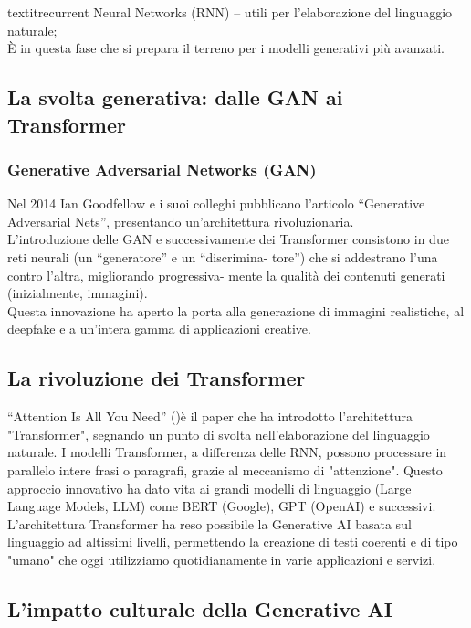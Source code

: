 \documentclass[14pt]{extbook}
\begin{document}
textit{recurrent Neural Networks (RNN) –} utili per l’elaborazione del linguaggio naturale;\\

È in questa fase che si prepara il terreno per i modelli generativi più avanzati.\\
\subsection{La svolta generativa: dalle GAN ai Transformer}
\subsubsection{Generative Adversarial Networks (GAN)}
Nel 2014 Ian Goodfellow e i suoi colleghi pubblicano l’articolo “Generative Adversarial Nets”, presentando un’architettura rivoluzionaria.\\

L’introduzione delle GAN \cite{goodfellow2014gan} e successivamente dei Transformer \cite{vaswani2017attention}consistono in due reti neurali (un “generatore” e un “discrimina- tore”) che si addestrano l’una contro l’altra, migliorando progressiva- mente la qualità dei contenuti generati (inizialmente, immagini).\\

Questa innovazione ha aperto la porta alla generazione di immagini realistiche, al deepfake e a un’intera gamma di applicazioni creative.\\

\subsection{La rivoluzione dei Transformer}
“Attention Is All You Need” (\cite{vaswani2017})è il paper che ha introdotto l'architettura "Transformer", segnando un punto di svolta nell'elaborazione del linguaggio naturale. I modelli Transformer, a differenza delle RNN, possono processare in parallelo intere frasi o paragrafi, grazie al meccanismo di "attenzione". Questo approccio innovativo ha dato vita ai grandi modelli di linguaggio (Large Language Models, LLM) come BERT (Google), GPT (OpenAI) e successivi. L'architettura Transformer ha reso possibile la Generative AI basata sul linguaggio ad altissimi livelli, permettendo la creazione di testi coerenti e di tipo "umano" che oggi utilizziamo quotidianamente in varie applicazioni e servizi.\\

\subsection{L’impatto culturale della Generative AI}
\end{document}
